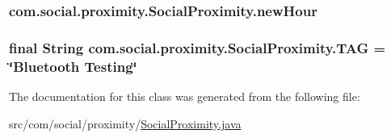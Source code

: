 \subsubsection[{new\+Hour}]{ com.\+social.\+proximity.\+Social\+Proximity.\+new\+Hour\hspace{0.3cm}{\ttfamily [private]}}\label{classcom_1_1social_1_1proximity_1_1_social_proximity_ab3d29f906dd80ba99f79bbe848658294}
\hypertarget{classcom_1_1social_1_1proximity_1_1_social_proximity_ac2be9322648a27ced5d00e8eae40bac4}{}
\subsubsection[{T\+A\+G}]{\setlength{\rightskip}{0pt plus 5cm}final String com.\+social.\+proximity.\+Social\+Proximity.\+T\+A\+G = \char`\"{}Bluetooth Testing\char`\"{}\hspace{0.3cm}{\ttfamily [private]}}\label{classcom_1_1social_1_1proximity_1_1_social_proximity_ac2be9322648a27ced5d00e8eae40bac4}


The documentation for this class was generated from the following file\+:\begin{DoxyCompactItemize}
\item 
src/com/social/proximity/\hyperlink{_social_proximity_8java}{Social\+Proximity.\+java}\end{DoxyCompactItemize}
